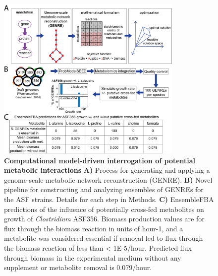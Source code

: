 \documentclass[11pt,twocolumn,notitlepage,openany,twoside]{book}
\begin{document}
\begin{refsection}
\begin{figure}[tb]
\centering
\includegraphics[width=0.8\textwidth]{ch2_figS3}
\caption[Computational model-driven interrogation of potential metabolic interactions and experimental validation of a cross-feeding interaction.]{\textbf{Computational model-driven interrogation of potential metabolic interactions}  \textbf{A)} Process for generating and applying a genome-scale metabolic network reconstruction (GENRE). \textbf{B)} Novel pipeline for constructing and analyzing ensembles of GENREs for the ASF strains. Details for each step in Methods. \textbf{C)} EnsembleFBA predictions of the influence of potentially cross-fed metabolites on growth of \textit{Clostridium} ASF356. Biomass production values are for flux through the biomass reaction in units of hour-1, and a metabolite was considered essential if removal led to flux through the biomass reaction of less than \textless\! 1E-5/hour. Predicted flux through biomass in the experimental medium without any supplement or metabolite removal is 0.079/hour.}
\end{figure}


\end{refsection}
\end{document}
